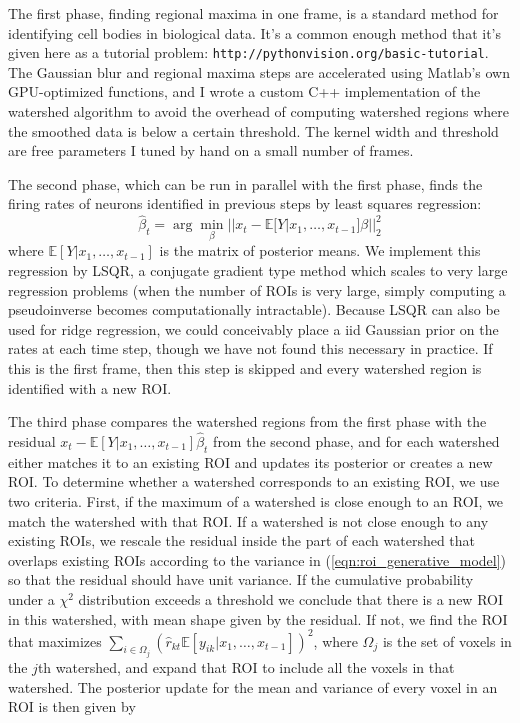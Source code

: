 \documentclass[11pt]{amsart}
\begin{document}
The first phase, finding regional maxima in one frame, is a standard method for identifying cell bodies in biological data. It's a common enough method that it's given here as a tutorial problem: {\tt http://pythonvision.org/basic-tutorial}. The Gaussian blur and regional maxima steps are accelerated using Matlab's own GPU-optimized functions, and I wrote a custom C++ implementation of the watershed algorithm to avoid the overhead of computing watershed regions where the smoothed data is below a certain threshold. The kernel width and threshold are free parameters I tuned by hand on a small number of frames.

The second phase, which can be run in parallel with the first phase, finds the firing rates of neurons identified in previous steps by least squares regression:
\[\hat{\beta}_t = \arg\min_\beta ||x_t - \mathbb{E}[Y|x_1,\ldots,x_{t-1}]\beta||^2_2\]
where $\mathbb{E}[Y|x_1,\ldots,x_{t-1}]$ is the matrix of posterior means. We implement this regression by LSQR, a conjugate gradient type method which scales to very large regression problems (when the number of ROIs is very large, simply computing a pseudoinverse becomes computationally intractable). Because LSQR can also be used for ridge regression, we could conceivably place a iid Gaussian prior on the rates at each time step, though we have not found this necessary in practice. If this is the first frame, then this step is skipped and every watershed region is identified with a new ROI.

The third phase compares the watershed regions from the first phase with the residual $x_t - \mathbb{E}[Y|x_1,\ldots,x_{t-1}]\hat{\beta}_t$ from the second phase, and for each watershed either matches it to an existing ROI and updates its posterior or creates a new ROI. To determine whether a watershed corresponds to an existing ROI, we use two criteria. First, if the maximum of a watershed is close enough to an ROI, we match the watershed with that ROI. If a watershed is not close enough to any existing ROIs, we rescale the residual inside the part of each watershed that overlaps existing ROIs according to the variance in (\ref{eqn:roi_generative_model}) so that the residual should have unit variance. If the cumulative probability under a $\chi^2$ distribution exceeds a threshold we conclude that there is a new ROI in this watershed, with mean shape given by the residual. If not, we find the ROI that maximizes $\sum_{i\in \Omega_j} (\hat{r}_{kt} \mathbb{E}[y_{ik}|x_1,\ldots,x_{t-1}])^2$, where $\Omega_j$ is the set of voxels in the $j$th watershed, and expand that ROI to include all the voxels in that watershed.  The posterior update for the mean and variance of every voxel in an ROI is then given by
\end{document}
